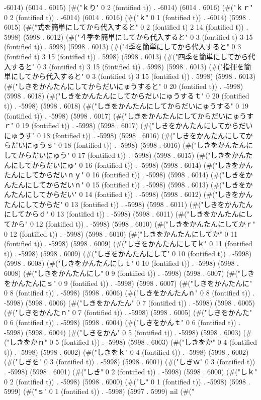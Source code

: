 -6014) (6014 . 6015) (#("ｋり" 0 2 (fontified t)) . -6014) (6014 . 6016) (#("ｋｒ" 0 2 (fontified t)) . -6014) (6014 . 6016) (#("ｋ" 0 1 (fontified t)) . -6014) (5998 . 6015) (#("式を簡単にしてから代入すると" 0 2 (fontified t) 2 14 (fontified t)) . 5998) (5998 . 6012) (#("４季を簡単にしてから代入すると" 0 3 (fontified t) 3 15 (fontified t)) . 5998) (5998 . 6013) (#("4季を簡単にしてから代入すると" 0 3 (fontified t) 3 15 (fontified t)) . 5998) (5998 . 6013) (#("四季を簡単にしてから代入すると" 0 3 (fontified t) 3 15 (fontified t)) . 5998) (5998 . 6013) (#("指揮を簡単にしてから代入すると" 0 3 (fontified t) 3 15 (fontified t)) . 5998) (5998 . 6013) (#("しきをかんたんにしてからだいにゅうすると" 0 20 (fontified t)) . -5998) (5998 . 6018) (#("しきをかんたんにしてからだいにゅうするｔ" 0 20 (fontified t)) . -5998) (5998 . 6018) (#("しきをかんたんにしてからだいにゅうする" 0 19 (fontified t)) . -5998) (5998 . 6017) (#("しきをかんたんにしてからだいにゅうすｒ" 0 19 (fontified t)) . -5998) (5998 . 6017) (#("しきをかんたんにしてからだいにゅうす" 0 18 (fontified t)) . -5998) (5998 . 6016) (#("しきをかんたんにしてからだいにゅうｓ" 0 18 (fontified t)) . -5998) (5998 . 6016) (#("しきをかんたんにしてからだいにゅう" 0 17 (fontified t)) . -5998) (5998 . 6015) (#("しきをかんたんにしてからだいにゅ" 0 16 (fontified t)) . -5998) (5998 . 6014) (#("しきをかんたんにしてからだいｎｙ" 0 16 (fontified t)) . -5998) (5998 . 6014) (#("しきをかんたんにしてからだいｎ" 0 15 (fontified t)) . -5998) (5998 . 6013) (#("しきをかんたんにしてからだい" 0 14 (fontified t)) . -5998) (5998 . 6012) (#("しきをかんたんにしてからだ" 0 13 (fontified t)) . -5998) (5998 . 6011) (#("しきをかんたんにしてからｄ" 0 13 (fontified t)) . -5998) (5998 . 6011) (#("しきをかんたんにしてから" 0 12 (fontified t)) . -5998) (5998 . 6010) (#("しきをかんたんにしてかｒ" 0 12 (fontified t)) . -5998) (5998 . 6010) (#("しきをかんたんにしてか" 0 11 (fontified t)) . -5998) (5998 . 6009) (#("しきをかんたんにしてｋ" 0 11 (fontified t)) . -5998) (5998 . 6009) (#("しきをかんたんにして" 0 10 (fontified t)) . -5998) (5998 . 6008) (#("しきをかんたんにしｔ" 0 10 (fontified t)) . -5998) (5998 . 6008) (#("しきをかんたんにし" 0 9 (fontified t)) . -5998) (5998 . 6007) (#("しきをかんたんにｓ" 0 9 (fontified t)) . -5998) (5998 . 6007) (#("しきをかんたんに" 0 8 (fontified t)) . -5998) (5998 . 6006) (#("しきをかんたんｎ" 0 8 (fontified t)) . -5998) (5998 . 6006) (#("しきをかんたん" 0 7 (fontified t)) . -5998) (5998 . 6005) (#("しきをかんたｎ" 0 7 (fontified t)) . -5998) (5998 . 6005) (#("しきをかんた" 0 6 (fontified t)) . -5998) (5998 . 6004) (#("しきをかんｔ" 0 6 (fontified t)) . -5998) (5998 . 6004) (#("しきをかん" 0 5 (fontified t)) . -5998) (5998 . 6003) (#("しきをかｎ" 0 5 (fontified t)) . -5998) (5998 . 6003) (#("しきをか" 0 4 (fontified t)) . -5998) (5998 . 6002) (#("しきをｋ" 0 4 (fontified t)) . -5998) (5998 . 6002) (#("しきを" 0 3 (fontified t)) . -5998) (5998 . 6001) (#("しきｗ" 0 3 (fontified t)) . -5998) (5998 . 6001) (#("しき" 0 2 (fontified t)) . -5998) (5998 . 6000) (#("しｋ" 0 2 (fontified t)) . -5998) (5998 . 6000) (#("し" 0 1 (fontified t)) . -5998) (5998 . 5999) (#("ｓ" 0 1 (fontified t)) . -5998) (5997 . 5999) nil (#("
